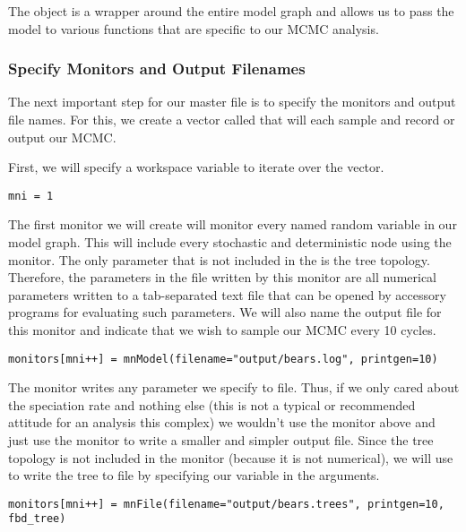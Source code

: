 The object  is a wrapper around the entire model graph and allows us to pass the model to various functions that are specific to our MCMC analysis.

\medskip
\subsubsection{Specify Monitors and Output Filenames}\label{subsub:Exercise-Monitors}

The next important step for our master \Rev file is to specify the monitors and output file names.
For this, we create a vector called  that will each sample and record or output our MCMC. 

First, we will specify a workspace variable to iterate over the  vector.
{\tt \begin{snugshade*}
\begin{lstlisting}
mni = 1
\end{lstlisting}
\end{snugshade*}}

The first monitor we will create will monitor every named random variable in our model graph. 
This will include every stochastic and deterministic node using the  monitor.
The only parameter that is not included in the  is the tree topology. 
Therefore, the parameters in the file written by this monitor are all numerical parameters written to a tab-separated text file that can be opened by accessory programs for evaluating such parameters.
We will also name the output file for this monitor and indicate that we wish to sample our MCMC every 10 cycles.
{\tt \begin{snugshade*}
\begin{lstlisting}
monitors[mni++] = mnModel(filename="output/bears.log", printgen=10)
\end{lstlisting}
\end{snugshade*}}

The  monitor writes any parameter we specify to file.
Thus, if we only cared about the speciation rate and nothing else (this is not a typical or recommended attitude for an analysis this complex) we wouldn't use the  monitor above and just use the  monitor to write a smaller and simpler output file.
Since the tree topology is not included in the  monitor (because it is not numerical), we will use  to write the tree to file by specifying our  variable in the arguments.
{\tt \begin{snugshade*}
\begin{lstlisting}
monitors[mni++] = mnFile(filename="output/bears.trees", printgen=10, fbd_tree)
\end{lstlisting}
\end{snugshade*}}

